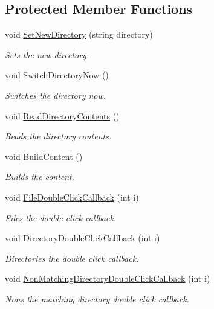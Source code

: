 \subsection*{Protected Member Functions}
\begin{DoxyCompactItemize}
\item 
void \hyperlink{class_lerp2_a_p_i_1_1_utility_1_1_file_browser_aa68ea9e64f15e83b27bf80764bffd73e}{Set\+New\+Directory} (string directory)
\begin{DoxyCompactList}\small\item\em Sets the new directory. \end{DoxyCompactList}\item 
void \hyperlink{class_lerp2_a_p_i_1_1_utility_1_1_file_browser_afe7a058a57d0d5cd2d23a4c8627f8d47}{Switch\+Directory\+Now} ()
\begin{DoxyCompactList}\small\item\em Switches the directory now. \end{DoxyCompactList}\item 
void \hyperlink{class_lerp2_a_p_i_1_1_utility_1_1_file_browser_a99457ee3afa64b50cd3f4268635714fd}{Read\+Directory\+Contents} ()
\begin{DoxyCompactList}\small\item\em Reads the directory contents. \end{DoxyCompactList}\item 
void \hyperlink{class_lerp2_a_p_i_1_1_utility_1_1_file_browser_aa21e664f5caf0c8a84ec02063b97b19c}{Build\+Content} ()
\begin{DoxyCompactList}\small\item\em Builds the content. \end{DoxyCompactList}\item 
void \hyperlink{class_lerp2_a_p_i_1_1_utility_1_1_file_browser_a8e7fc16e34dbdd6af88edc59fcafbee1}{File\+Double\+Click\+Callback} (int i)
\begin{DoxyCompactList}\small\item\em Files the double click callback. \end{DoxyCompactList}\item 
void \hyperlink{class_lerp2_a_p_i_1_1_utility_1_1_file_browser_a2e2843c8a971885de886d78a470a120b}{Directory\+Double\+Click\+Callback} (int i)
\begin{DoxyCompactList}\small\item\em Directories the double click callback. \end{DoxyCompactList}\item 
void \hyperlink{class_lerp2_a_p_i_1_1_utility_1_1_file_browser_ae12ef8d957873b57b6d93b6139607a2e}{Non\+Matching\+Directory\+Double\+Click\+Callback} (int i)
\begin{DoxyCompactList}\small\item\em Nons the matching directory double click callback. \end{DoxyCompactList}\end{DoxyCompactItemize}
